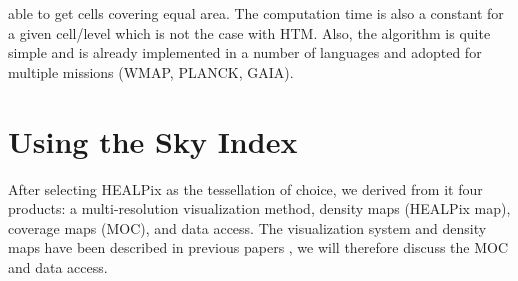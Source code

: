 able to get cells covering equal area. The computation time is also a constant for a given cell/level which is not the case with HTM. Also, the algorithm is quite simple and is already implemented in a number of languages and adopted for multiple missions  (WMAP, PLANCK, GAIA).


\section{Using the Sky Index}
After selecting HEALPix as the tessellation of choice, we derived from it four products: a multi-resolution visualization method, density maps (HEALPix map), coverage maps (MOC), and data access. The visualization system and density maps have been described in previous papers \citep{Fernique}, we will therefore discuss the MOC and data access.

